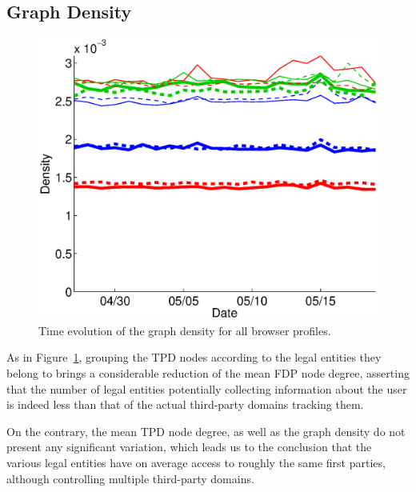 \documentclass[compsoc, conference, letterpaper, 10pt, times]{IEEEtran}
\begin{document}
\subsection{Graph Density}

  \begin{figure}
   \centering
  \includegraphics[width=.45\textwidth]{figures/density.eps}

  \caption{Time evolution of the graph density for all browser profiles.}
  \label{fig:metrics_graphdensity}
  \end{figure}
  
  
As in Figure~\ref{fig:metrics_graphdensity}, grouping the TPD nodes according to the legal entities they belong to brings a considerable reduction of the mean FDP node degree, asserting that the number of legal entities potentially collecting information about the user is indeed less than that of the actual third-party domains tracking them.

On the contrary, the mean TPD node degree, as well as the graph density do not present any significant variation, which leads us to the conclusion that the various legal entities have on average access to roughly the same first parties, although controlling multiple third-party domains.





\end{document}
